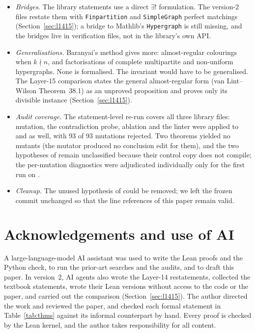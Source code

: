 \documentclass[11pt]{article}
\theoremstyle{definition}
\theoremstyle{remark}
\newcommand{\lean}[1]{\texttt{#1}}
\begin{document}
\begin{itemize}
\item \emph{Bridges.} The library statements use a direct $\exists!$ formulation. The version-2
files restate them with \lean{Finpartition} and \lean{SimpleGraph} perfect matchings
(Section~\ref{sec:l1415}); a bridge to Mathlib's \lean{Hypergraph} is still missing, and the bridges
live in verification files, not in the library's own API.
\item \emph{Generalisations.} Baranyai's method gives more: almost-regular colourings when
$k\nmid n$, and factorisations of complete multipartite and non-uniform hypergraphs. None is
formalised. The invariant would have to be generalised. The Layer-15 comparison states the general
almost-regular form (van Lint--Wilson Theorem~38.1) as an unproved proposition and proves only its
divisible instance (Section~\ref{sec:l1415}).
\item \emph{Audit coverage.} The statement-level re-run covers all three library files: mutation,
the contradiction probe, ablation and the linter were applied to  and
 as well, with 93 of 93 mutations rejected. Two theorems yielded no mutants
(the mutator produced no conclusion edit for them), and the two hypotheses of 
remain unclassified because their control copy does not compile; the per-mutation diagnostics were
adjudicated individually only for the first run on .
\item \emph{Cleanup.} The unused hypothesis of  could be removed; we left
the frozen commit unchanged so that the line references of this paper remain valid.
\end{itemize}

\section*{Acknowledgements and use of AI}
A large-language-model AI assistant was used to write the Lean proofs and the Python check, to run
the prior-art searches and the audits, and to draft this paper. In version~2, AI agents also wrote
the Layer-14 restatements, collected the textbook statements, wrote their Lean versions without access
to the code or the paper, and carried out the comparison (Section~\ref{sec:l1415}). The author directed the work and
reviewed the paper, and checked each formal statement in Table~\ref{tab:thms} against its informal
counterpart by hand. Every proof is checked by the Lean kernel, and the author takes responsibility
for all content.
\end{document}
